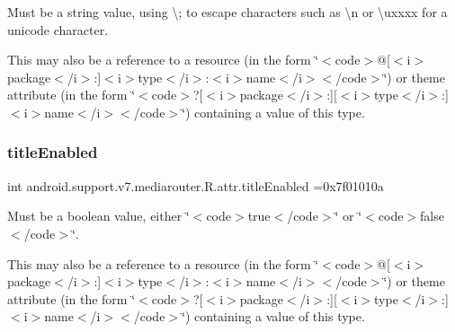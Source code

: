 Must be a string value, using \textquotesingle{}\textbackslash{};\textquotesingle{} to escape characters such as \textquotesingle{}\textbackslash{}n\textquotesingle{} or \textquotesingle{}\textbackslash{}uxxxx\textquotesingle{} for a unicode character. 

This may also be a reference to a resource (in the form \char`\"{}$<$code$>$@\mbox{[}$<$i$>$package$<$/i$>$\+:\mbox{]}$<$i$>$type$<$/i$>$\+:$<$i$>$name$<$/i$>$$<$/code$>$\char`\"{}) or theme attribute (in the form \char`\"{}$<$code$>$?\mbox{[}$<$i$>$package$<$/i$>$\+:\mbox{]}\mbox{[}$<$i$>$type$<$/i$>$\+:\mbox{]}$<$i$>$name$<$/i$>$$<$/code$>$\char`\"{}) containing a value of this type. \mbox{\label{classandroid_1_1support_1_1v7_1_1mediarouter_1_1R_1_1attr_a3d454b580504f78acb2c462a84d3796a}} 
\subsubsection{\texorpdfstring{title\+Enabled}{titleEnabled}}
{\footnotesize\ttfamily int android.\+support.\+v7.\+mediarouter.\+R.\+attr.\+title\+Enabled =0x7f01010a\hspace{0.3cm}{\ttfamily [static]}}

Must be a boolean value, either \char`\"{}$<$code$>$true$<$/code$>$\char`\"{} or \char`\"{}$<$code$>$false$<$/code$>$\char`\"{}. 

This may also be a reference to a resource (in the form \char`\"{}$<$code$>$@\mbox{[}$<$i$>$package$<$/i$>$\+:\mbox{]}$<$i$>$type$<$/i$>$\+:$<$i$>$name$<$/i$>$$<$/code$>$\char`\"{}) or theme attribute (in the form \char`\"{}$<$code$>$?\mbox{[}$<$i$>$package$<$/i$>$\+:\mbox{]}\mbox{[}$<$i$>$type$<$/i$>$\+:\mbox{]}$<$i$>$name$<$/i$>$$<$/code$>$\char`\"{}) containing a value of this type. \mbox{\label{classandroid_1_1support_1_1v7_1_1mediarouter_1_1R_1_1attr_aac9daa5285fa9308e4afab0e650b8f85}} 
